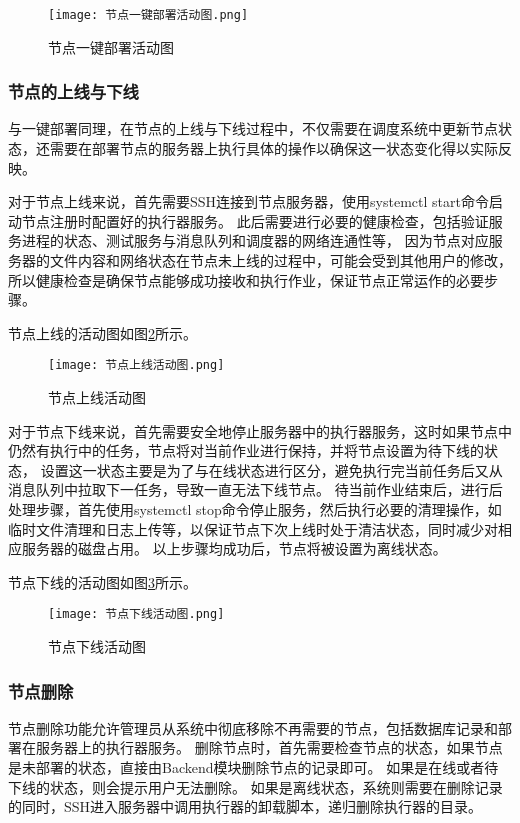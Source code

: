 \begin{figure}[h]
  \centering
  \texttt{[image: 节点一键部署活动图.png]}
  \caption{节点一键部署活动图}
  \label{fig:节点一键部署活动图}
\end{figure}

\subsubsection{节点的上线与下线}
与一键部署同理，在节点的上线与下线过程中，不仅需要在调度系统中更新节点状态，还需要在部署节点的服务器上执行具体的操作以确保这一状态变化得以实际反映。

对于节点上线来说，首先需要SSH连接到节点服务器，使用systemctl start命令启动节点注册时配置好的执行器服务。
此后需要进行必要的健康检查，包括验证服务进程的状态、测试服务与消息队列和调度器的网络连通性等，
因为节点对应服务器的文件内容和网络状态在节点未上线的过程中，可能会受到其他用户的修改，所以健康检查是确保节点能够成功接收和执行作业，保证节点正常运作的必要步骤。

节点上线的活动图如图\ref{fig:节点上线活动图}所示。

\begin{figure}[h]
  \centering
  \texttt{[image: 节点上线活动图.png]}
  \caption{节点上线活动图}
  \label{fig:节点上线活动图}
\end{figure}

对于节点下线来说，首先需要安全地停止服务器中的执行器服务，这时如果节点中仍然有执行中的任务，节点将对当前作业进行保持，并将节点设置为待下线的状态，
设置这一状态主要是为了与在线状态进行区分，避免执行完当前任务后又从消息队列中拉取下一任务，导致一直无法下线节点。
待当前作业结束后，进行后处理步骤，首先使用systemctl stop命令停止服务，然后执行必要的清理操作，如临时文件清理和日志上传等，以保证节点下次上线时处于清洁状态，同时减少对相应服务器的磁盘占用。
以上步骤均成功后，节点将被设置为离线状态。

节点下线的活动图如图\ref{fig:节点下线活动图}所示。

\begin{figure}[h]
  \centering
  \texttt{[image: 节点下线活动图.png]}
  \caption{节点下线活动图}
  \label{fig:节点下线活动图}
\end{figure}

\subsubsection{节点删除}
节点删除功能允许管理员从系统中彻底移除不再需要的节点，包括数据库记录和部署在服务器上的执行器服务。
删除节点时，首先需要检查节点的状态，如果节点是未部署的状态，直接由Backend模块删除节点的记录即可。
如果是在线或者待下线的状态，则会提示用户无法删除。
如果是离线状态，系统则需要在删除记录的同时，SSH进入服务器中调用执行器的卸载脚本，递归删除执行器的目录。


